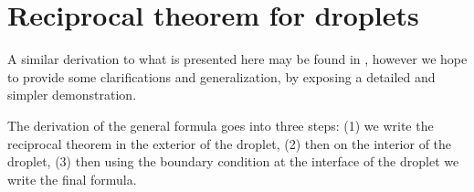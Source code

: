 \section{Reciprocal theorem for droplets}

A similar derivation to what is presented here may be found in \citet{lovalenti1993force,raja2010inertial}, however we hope to provide some clarifications and generalization, by exposing a detailed and simpler demonstration.  

The derivation of the general formula goes into three steps: (1) we write the reciprocal theorem in the exterior of the droplet, (2) then on the interior of the droplet, (3) then using the boundary condition at the interface of the droplet we write the final formula. 

